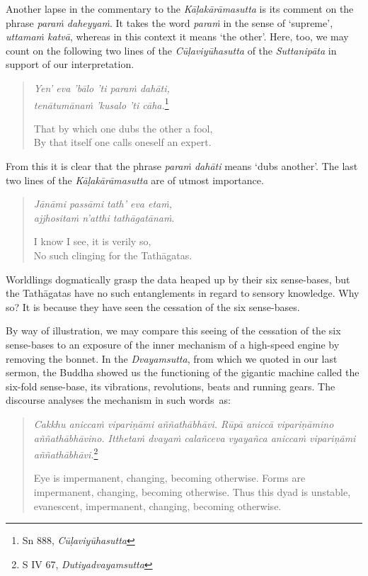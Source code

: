 Another lapse in the commentary to the \emph{Kāḷakārāmasutta} is its comment on the phrase \emph{paraṁ daheyyaṁ}. It takes the word \emph{paraṁ} in the sense of `supreme', \emph{uttamaṁ katvā}, whereas in this context it means `the other'. Here, too, we may count on the following two lines of the \emph{Cūḷaviyūhasutta} of the \emph{Suttanipāta} in support of our interpretation.

\begin{quote}
\emph{Yen' eva 'bālo 'ti paraṁ dahāti,}\\
\emph{tenātumānaṁ 'kusalo 'ti cāha.}\footnote{Sn 888, \emph{Cūḷaviyūhasutta}}

That by which one dubs the other a fool,\\
By that itself one calls oneself an expert.
\end{quote}

From this it is clear that the phrase \emph{paraṁ dahāti} means `dubs another'. The last two lines of the \emph{Kāḷakārāmasutta} are of utmost importance.

\begin{quote}
\emph{Jānāmi passāmi tath' eva etaṁ,}\\
\emph{ajjhositaṁ n'atthi tathāgatānaṁ}.

I know I see, it is verily so,\\
No such clinging for the Tathāgatas.
\end{quote}

Worldlings dogmatically grasp the data heaped up by their six sense-bases, but the Tathāgatas have no such entanglements in regard to sensory knowledge. Why so? It is because they have seen the cessation of the six sense-bases.

By way of illustration, we may compare this seeing of the cessation of the six sense-bases to an exposure of the inner mechanism of a high-speed engine by removing the bonnet. In the \emph{Dvayamsutta}, from which we quoted in our last sermon, the Buddha showed us the functioning of the gigantic machine called the six-fold sense-base, its vibrations, revolutions, beats and running gears. The discourse analyses the mechanism in such words~as:

\begin{quote}
\emph{Cakkhu aniccaṁ vipariṇāmi aññathābhāvi. Rūpā aniccā vipariṇāmino aññathābhāvino. Itthetaṁ dvayaṁ calañceva vyayañca aniccaṁ vipariṇāmi aññathābhāvi.}\footnote{S IV 67, \emph{Dutiyadvayamsutta}}

Eye is impermanent, changing, becoming otherwise. Forms are impermanent, changing, becoming otherwise. Thus this dyad is unstable, evanescent, impermanent, changing, becoming otherwise.
\end{quote}

